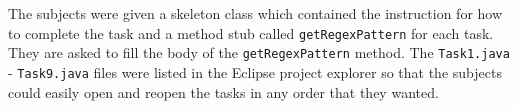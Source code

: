 \documentclass[10pt, conference, compsocconf]{IEEEtran}
\begin{document}
%
%	
%		
%		
%		
%		
%		
%		
%		
%		
%		
%		
%	
%	
%		
%		
%		
%		
%	
%

The subjects were given a skeleton class which contained the instruction for how to complete the task and a method stub called \texttt{getRegexPattern} for each task. They are asked to fill the body of the \texttt{getRegexPattern} method. The \texttt{Task1.java} - \texttt{Task9.java} files were listed in the Eclipse project explorer so that the subjects could easily open and reopen the tasks in any order that they wanted.
\end{document}
